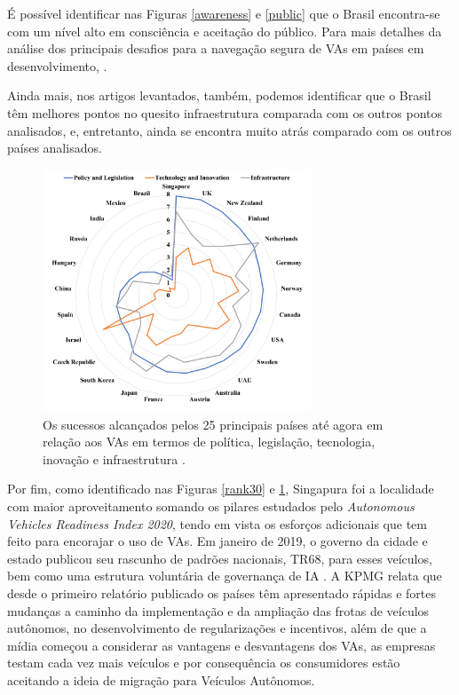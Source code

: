 É possível identificar nas Figuras \ref{awareness} e \ref{public} que o Brasil encontra-se com um nível alto em consciência e aceitação do público. Para mais detalhes da análise dos principais desafios para a navegação segura de VAs em países em desenvolvimento, \cite{mundobrasil}.

Ainda mais, nos artigos levantados, também, podemos identificar que o Brasil têm melhores pontos no quesito infraestrutura comparada com os outros pontos analisados, e, entretanto, ainda se encontra muito atrás comparado com os outros países analisados.

\begin{figure}[H]
\centering
\includegraphics[width=8cm]{Figures/future.png}
\caption{Os sucessos alcançados pelos 25 principais países até agora em relação aos VAs em termos de política, legislação, tecnologia, inovação e infraestrutura \cite{future-view}.}
\label{figura_future-view}
\end{figure}



Por fim, como identificado nas Figuras \ref{rank30} e \ref{figura_future-view}, Singapura foi a localidade com maior aproveitamento somando os pilares estudados pelo \textit{Autonomous Vehicles Readiness Index 2020}, tendo em vista os esforços adicionais que tem feito para encorajar o uso de VAs. Em janeiro de 2019, o governo da cidade e estado publicou seu rascunho de padrões nacionais, TR68, para esses veículos, bem como uma estrutura voluntária de governança de IA \cite{KPMG}. A KPMG relata que desde o primeiro relatório publicado os países têm apresentado rápidas e fortes mudanças a caminho da implementação e da ampliação das frotas de veículos autônomos, no desenvolvimento de regularizações e incentivos, além de que a mídia começou a considerar as vantagens e desvantagens dos VAs, as empresas testam cada vez mais veículos e por consequência os consumidores estão aceitando a ideia de migração para Veículos Autônomos.

